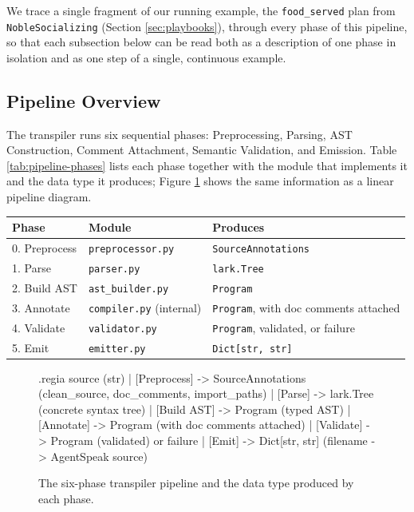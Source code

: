 We trace a single fragment of our running example, the \lstinline|food_served| plan from \lstinline|NobleSocializing| (Section \ref{sec:playbooks}), through every phase of this pipeline, so that each subsection below can be read both as a description of one phase in isolation and as one step of a single, continuous example.

\subsection{Pipeline Overview}
\label{sec:pipeline-overview}
The transpiler runs six sequential phases: Preprocessing, Parsing, AST Construction, Comment Attachment, Semantic Validation, and Emission. Table \ref{tab:pipeline-phases} lists each phase together with the module that implements it and the data type it produces; Figure \ref{fig:pipeline-overview} shows the same information as a linear pipeline diagram.

\begin{center}
\begin{tabular}{|l|l|l|}
\hline
\textbf{Phase} & \textbf{Module} & \textbf{Produces} \\
\hline
0. Preprocess & \lstinline|preprocessor.py| & \lstinline|SourceAnnotations| \\
1. Parse      & \lstinline|parser.py|       & \lstinline|lark.Tree| \\
2. Build AST  & \lstinline|ast_builder.py| & \lstinline|Program| \\
3. Annotate   & \lstinline|compiler.py| (internal) & \lstinline|Program|, with doc comments attached \\
4. Validate   & \lstinline|validator.py|    & \lstinline|Program|, validated, or failure \\
5. Emit       & \lstinline|emitter.py|      & \lstinline|Dict[str, str]| \\
\hline
\end{tabular}
\end{center}
\label{tab:pipeline-phases}

\begin{figure}[h]
    \centering
    \begin{codeblock}[]{}
      .regia source (str)
            |
      [Preprocess]  ->  SourceAnnotations (clean_source, doc_comments, import_paths)
            |
      [Parse]       ->  lark.Tree (concrete syntax tree)
            |
      [Build AST]   ->  Program (typed AST)
            |
      [Annotate]    ->  Program (with doc comments attached)
            |
      [Validate]    ->  Program (validated) or failure
            |
      [Emit]        ->  Dict[str, str] (filename -> AgentSpeak source)
    \end{codeblock}
    \caption{The six-phase transpiler pipeline and the data type produced by each phase.}
    \label{fig:pipeline-overview}
\end{figure}

